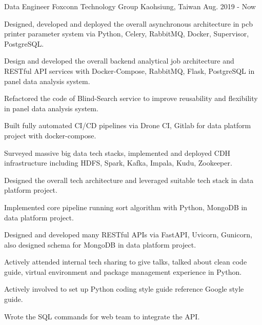 

\begin{cventries}

  \cventry
    {Data Engineer} %
    {Foxconn Technology Group} %
    {Kaohsiung, Taiwan} %
    {Aug. 2019 - Now} %
    {
      \begin{cvitems} %
        \item {Designed, developed and deployed the overall asynchronous architecture in pcb printer parameter system via Python, Celery, RabbitMQ, Docker, Supervisor, PostgreSQL.}
        \item {Design and developed the overall backend analytical job architecture and RESTful API services with Docker-Compose, RabbitMQ, Flask, PostgreSQL in panel data analysis system.}
        \item {Refactored the code of Blind-Search service to improve reusability and flexibility in panel data analysis system.}
        \item {Built fully automated CI/CD pipelines via Drone CI, Gitlab for data platform project with docker-compose.}
        \item {Surveyed massive big data tech stacks, implemented and deployed CDH infrastructure including HDFS, Spark, Kafka, Impala, Kudu, Zookeeper.}
        \item {Designed the overall tech architecture and leveraged suitable tech stack in data platform project.}
        \item {Implemented core pipeline running sort algorithm with Python, MongoDB in data platform project.}
        \item {Designed and developed many RESTful APIs via FastAPI, Uvicorn, Gunicorn, also designed schema for MongoDB in data platform project.}
        \item {Actively attended internal tech sharing to give talks, talked about clean code guide, virtual environment and package management experience in Python.}
        \item {Actively involved to set up Python coding style guide reference Google style guide.}
        \item {Wrote the SQL commands for web team to integrate the API.}
      \end{cvitems}
    }


\end{cventries}
